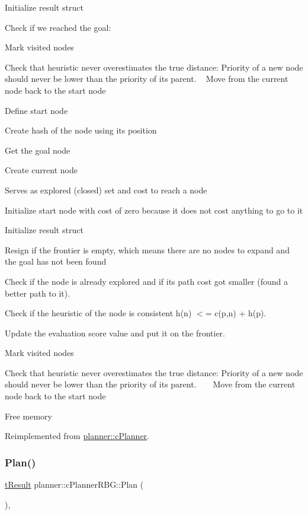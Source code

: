 Initialize result struct

Check if we reached the goal\+:

Mark visited nodes

Check that heuristic never overestimates the true distance\+: Priority of a new node should never be lower than the priority of its parent. ~\newline
 Move from the current node back to the start node

Define start node

Create hash of the node using its position

Get the goal node

Create current node

Serves as explored (closed) set and cost to reach a node

Initialize start node with cost of zero because it does not cost anything to go to it

Initialize result struct

Resign if the frontier is empty, which means there are no nodes to expand and the goal has not been found

Check if the node is already explored and if its path cost got smaller (found a better path to it).

Check if the heuristic of the node is consistent h(n) $<$= c(p,n) + h(p).

Update the evaluation score value and put it on the frontier.

Mark visited nodes

Check that heuristic never overestimates the true distance\+: Priority of a new node should never be lower than the priority of its parent. ~\newline
~\newline
 Move from the current node back to the start node

Free memory 

Reimplemented from \mbox{\hyperlink{classplanner_1_1c_planner_a341e70531266f023ac9461d18979d1ef}{planner\+::c\+Planner}}.

\mbox{\label{classplanner_1_1c_planner_r_b_g_a0bbd752702da582a47dbd153c0065eb5}} 
\subsubsection{\texorpdfstring{Plan()}{Plan()}}
{\footnotesize\ttfamily \mbox{\hyperlink{structt_result}{t\+Result}} planner\+::c\+Planner\+R\+B\+G\+::\+Plan (\begin{DoxyParamCaption}{ }\end{DoxyParamCaption})\hspace{0.3cm}{\ttfamily [override]}, {\ttfamily [virtual]}}



